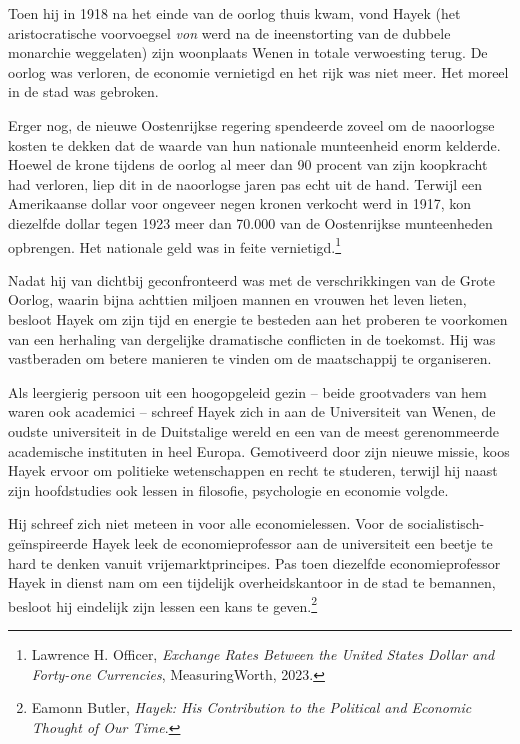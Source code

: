 \documentclass[
  a5paper,
  smalldemyvopaper,11pt,twoside,onecolumn,openright,extrafontsizes,
hidelinks]{memoir}
\begin{document}
Toen hij in 1918 na het einde van de oorlog thuis kwam, vond Hayek (het
aristocratische voorvoegsel \emph{von} werd na de ineenstorting van de
dubbele monarchie weggelaten) zijn woonplaats Wenen in totale
verwoesting terug. De oorlog was verloren, de economie vernietigd en het
rijk was niet meer. Het moreel in de stad was gebroken.

Erger nog, de nieuwe Oostenrijkse regering spendeerde zoveel om de
naoorlogse kosten te dekken dat de waarde van hun nationale munteenheid
enorm kelderde. Hoewel de krone tijdens de oorlog al meer dan 90 procent
van zijn koopkracht had verloren, liep dit in de naoorlogse jaren pas
echt uit de hand. Terwijl een Amerikaanse dollar voor ongeveer negen
kronen verkocht werd in 1917, kon diezelfde dollar tegen 1923 meer dan
70.000 van de Oostenrijkse munteenheden opbrengen. Het nationale geld
was in feite vernietigd.\footnote{\hspace{0pt}Lawrence H. Officer,
  \emph{Exchange Rates Between the United States Dollar and Forty-one
  Currencies}, MeasuringWorth, 2023.}

Nadat hij van dichtbij geconfronteerd was met de verschrikkingen van de
Grote Oorlog, waarin bijna achttien miljoen mannen en vrouwen het leven
lieten, besloot Hayek om zijn tijd en energie te besteden aan het
proberen te voorkomen van een herhaling van dergelijke dramatische
conflicten in de toekomst. Hij was vastberaden om betere manieren te
vinden om de maatschappij te organiseren.

Als leergierig persoon uit een hoogopgeleid gezin -- beide grootvaders
van hem waren ook academici -- schreef Hayek zich in aan de Universiteit
van Wenen, de oudste universiteit in de Duitstalige wereld en een van de
meest gerenommeerde academische instituten in heel Europa. Gemotiveerd
door zijn nieuwe missie, koos Hayek ervoor om politieke wetenschappen en
recht te studeren, terwijl hij naast zijn hoofdstudies ook lessen in
filosofie, psychologie en economie volgde.

Hij schreef zich niet meteen in voor alle economielessen. Voor de
socialistisch-geïnspireerde Hayek leek de economieprofessor aan de
universiteit een beetje te hard te denken vanuit vrijemarktprincipes.
Pas toen diezelfde economieprofessor Hayek in dienst nam om een
tijdelijk overheidskantoor in de stad te bemannen, besloot hij eindelijk
zijn lessen een kans te geven.\footnote{\hspace{0pt}Eamonn Butler,
  \emph{Hayek: His Contribution to the Political and Economic Thought of
  Our Time}.}
\end{document}
